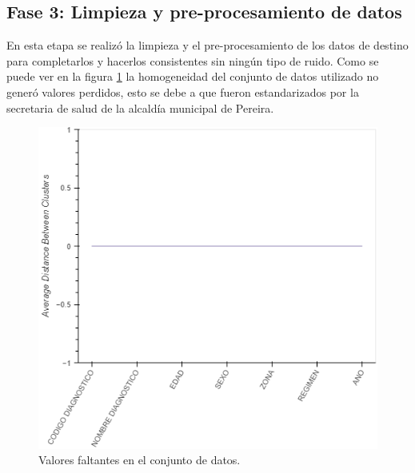 \subsection{Fase 3: Limpieza y pre-procesamiento de datos}
En esta etapa se realizó la limpieza y el pre-procesamiento de los datos de destino para completarlos y hacerlos consistentes sin ningún tipo de ruido. Como se puede ver en la figura \ref{missing_data} la homogeneidad del conjunto de datos utilizado no generó valores perdidos, esto se debe a que fueron estandarizados por la secretaria de salud de la alcaldía municipal de Pereira.

\begin{figure}[h!]
	\centering
	\includegraphics[width=0.9
	\linewidth]{IMAGENES/MISSING_DATA}
	\caption{Valores faltantes en el conjunto de datos.}
	\label{missing_data}
\end{figure} 


